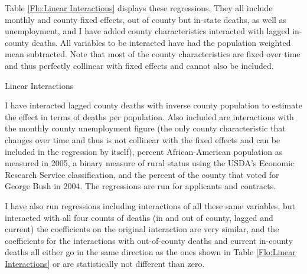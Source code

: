 \documentclass[12pt] {article}
\begin{document}
Table \ref{Flo:Linear Interactions} displays these regressions.
They all include monthly and county fixed effects, out of county but
in-state deaths, as well as unemployment, and I have added county
characteristics interacted with lagged in-county deaths. All variables
to be interacted have had the population weighted mean subtracted. %
Note that most of the county characteristics are fixed over time and thus perfectly collinear with fixed effects and cannot also be included.

\begin{table}
\caption{Linear Interactions}
\label{Flo:Linear Interactions}
\end{table}

I have interacted lagged county deaths with inverse county population to estimate the effect in terms of deaths per population. Also included are interactions with the monthly county unemployment figure (the only county characteristic
that changes over time and thus is not collinear with the fixed effects
and can be included in the regression by itself), percent African-American
population as measured in 2005, %
a binary measure of rural status using the USDA's Economic Research Service classification, and the percent of the county that voted for George Bush in 2004.
The regressions are run for applicants and contracts.%

I have also run regressions including interactions of all these same
variables, but interacted with all four counts of deaths (in and out
of county, lagged and current) the coefficients on the original interaction
are very similar, and the coefficients for the interactions with out-of-county
deaths and current in-county deaths all either go in the same direction
as the ones shown in Table \ref{Flo:Linear Interactions} or are
statistically not different than zero. 
\end{document}
